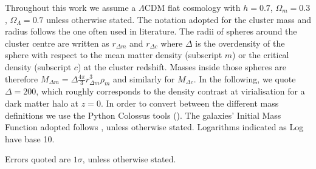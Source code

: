Throughout this work we assume a $\Lambda$CDM flat cosmology with $h=0.7$, $\Omega_m = 0.3$, $\Omega_\Lambda =0.7$ unless otherwise stated. The notation adopted for the cluster mass and radius follows the one often used in literature. The radii of spheres around the cluster centre are written as $r_{\Delta m}$ and $r_{\Delta c}$ where $\Delta$ is the overdensity of the sphere with respect to the mean matter density (subscript $m$) or the critical density (subscript $c$) at the cluster redshift. Masses inside those spheres are therefore $M_{\Delta m}=\Delta \frac{4 \pi }{3}r^3_{\Delta m}\rho_m$ and similarly for $M_{\Delta c}$.  In the following, we quote $\Delta=200$, which roughly corresponds to the density contrast at virialisation for a dark matter halo at $z=0$. In order to convert between the different mass definitions we use the Python Colossus tools (\citealt{colossus}). The galaxies' Initial Mass Function adopted follows \citet{chabrier}, unless otherwise stated. Logarithms indicated as Log have base 10.

Errors quoted are $1\sigma$, unless otherwise stated.






